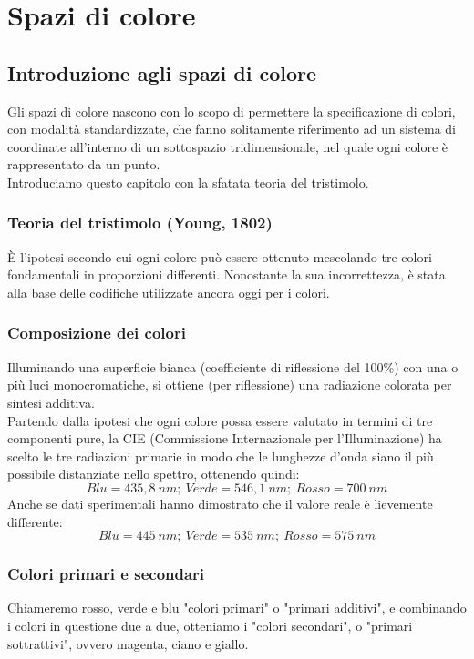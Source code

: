 \documentclass{report}
\begin{document}
	\chapter{Spazi di colore}
	\section{Introduzione agli spazi di colore}
	Gli spazi di colore nascono con lo scopo di permettere la specificazione di colori, con modalità standardizzate, che fanno solitamente riferimento ad un sistema di coordinate all'interno di un sottospazio tridimensionale, nel quale ogni colore è rappresentato da un punto.\\
	Introduciamo questo capitolo con la sfatata teoria del tristimolo.
	\subsection{Teoria del tristimolo (Young, 1802)}
	È l'ipotesi secondo cui ogni colore può essere ottenuto mescolando tre colori fondamentali in proporzioni differenti. Nonostante la sua incorrettezza, è stata alla base delle codifiche utilizzate ancora oggi per i colori.
	
	\subsection{Composizione dei colori}
	Illuminando una superficie bianca (coefficiente di riflessione del 100\%) con una o più luci monocromatiche, si ottiene (per riflessione) una radiazione colorata per sintesi additiva.\\
	Partendo dalla ipotesi che ogni colore possa essere valutato in termini di tre componenti pure, la CIE (Commissione Internazionale per l'Illuminazione) ha scelto le tre radiazioni primarie in modo che le lunghezze d'onda siano il più possibile distanziate nello spettro, ottenendo quindi:
	$$
	Blu = 435,8 \ nm; \ Verde = 546,1 \ nm; \ Rosso=700 \ nm
	$$
	Anche se dati sperimentali hanno dimostrato che il valore reale è lievemente differente:
	$$
	Blu = 445 \ nm; \ Verde = 535 \ nm; \ Rosso=575 \ nm
	$$
	\subsection{Colori primari e secondari}
	Chiameremo rosso, verde e blu "colori primari" o "primari additivi", e combinando i colori in questione due a due, otteniamo i "colori secondari", o "primari sottrattivi", ovvero magenta, ciano e giallo.
\end{document}
